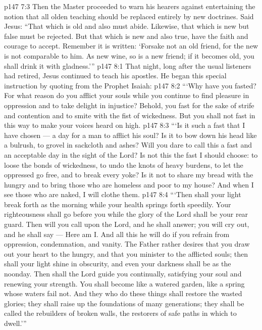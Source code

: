 \vs p147 7:3 Then the Master proceeded to warn his hearers against entertaining the notion that all olden teaching should be replaced entirely by new doctrines. Said Jesus: \textcolor{ubdarkred}{“That which is old and also  must abide. Likewise, that which is new but false must be rejected. But that which is new and also true, have the faith and courage to accept. Remember it is written: ‘Forsake not an old friend, for the new is not comparable to him. As new wine, so is a new friend; if it becomes old, you shall drink it with gladness.’”}
\vs p147 8:1 That night, long after the usual listeners had retired, Jesus continued to teach his apostles. He began this special instruction by quoting from the Prophet Isaiah:
\vs p147 8:2 \pc \textcolor{ubdarkred}{“‘Why have you fasted? For what reason do you afflict your souls while you continue to find pleasure in oppression and to take delight in injustice? Behold, you fast for the sake of strife and contention and to smite with the fist of wickedness. But you shall not fast in this way to make your voices heard on high.}
\vs p147 8:3 \textcolor{ubdarkred}{“‘Is it such a fast that I have chosen --- a day for a man to afflict his soul? Is it to bow down his head like a bulrush, to grovel in sackcloth and ashes? Will you dare to call this a fast and an acceptable day in the sight of the Lord? Is not this the fast I should choose: to loose the bonds of wickedness, to undo the knots of heavy burdens, to let the oppressed go free, and to break every yoke? Is it not to share my bread with the hungry and to bring those who are homeless and poor to my house? And when I see those who are naked, I will clothe them.}
\vs p147 8:4 \textcolor{ubdarkred}{“‘Then shall your light break forth as the morning while your health springs forth speedily. Your righteousness shall go before you while the glory of the Lord shall be your rear guard. Then will you call upon the Lord, and he shall answer; you will cry out, and he shall say --- Here am I. And all this he will do if you refrain from oppression, condemnation, and vanity. The Father rather desires that you draw out your heart to the hungry, and that you minister to the afflicted souls; then shall your light shine in obscurity, and even your darkness shall be as the noonday. Then shall the Lord guide you continually, satisfying your soul and renewing your strength. You shall become like a watered garden, like a spring whose waters fail not. And they who do these things shall restore the wasted glories; they shall raise up the foundations of many generations; they shall be called the rebuilders of broken walls, the restorers of safe paths in which to dwell.’”}
